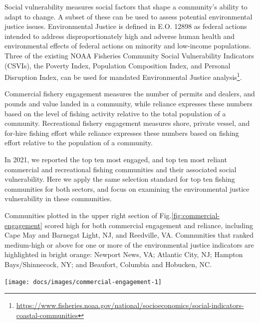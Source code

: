 \documentclass[
  10pt,
]{article}
\let\origfigure\figure
\let\endorigfigure\endfigure
\renewenvironment{figure}[1][2] {
    \expandafter\origfigure\expandafter[H]
} {
    \endorigfigure
}
\begin{document}
Social vulnerability measures social factors that shape a community's
ability to adapt to change. A subset of these can be used to assess
potential environmental justice issues. Environmental Justice is defined
in E.O. 12898 as federal actions intended to address disproportionately
high and adverse human health and environmental effects of federal
actions on minority and low-income populations. Three of the existing
NOAA Fisheries Community Social Vulnerability Indicators (CSVIs), the
Poverty Index, Population Composition Index, and Personal Disruption
Index, can be used for mandated Environmental Justice
analysis\footnote{\url{https://www.fisheries.noaa.gov/national/socioeconomics/social-indicators-coastal-communities}}.

Commercial fishery engagement measures the number of permits and
dealers, and pounds and value landed in a community, while reliance
expresses these numbers based on the level of fishing activity relative
to the total population of a community. Recreational fishery engagement
measures shore, private vessel, and for-hire fishing effort while
reliance expresses these numbers based on fishing effort relative to the
population of a community.

In 2021, we reported the top ten most engaged, and top ten most reliant
commercial and recreational fishing communities and their associated
social vulnerability. Here we apply the same selection standard for top
ten fishing communities for both sectors, and focus on examining the
environmental justice vulnerability in these communities.

Communities plotted in the upper right section of
Fig.\ref{fig:commercial-engagement} scored high for both commercial
engagement and reliance, including Cape May and Barnegat Light, NJ, and
Reedville, VA. Communities that ranked medium-high or above for one or
more of the environmental justice indicators are highlighted in bright
orange: Newport News, VA; Atlantic City, NJ; Hampton Bays/Shinnecock,
NY; and Beaufort, Columbia and Hobucken, NC.

\begin{figure}

{\centering \texttt{[image: docs/images/commercial-engagement-1]} 

}

\caption{Commercial engagement, reliance, and environmental justice vulnerability for the top commercially engaged and reliant fishing communities in the Mid-Atlantic.  Communities ranked medium-high or above for one or more of the environmental justice indicators are highlighted in bright orange.}\label{fig:commercial-engagement}
\end{figure}
\end{document}
